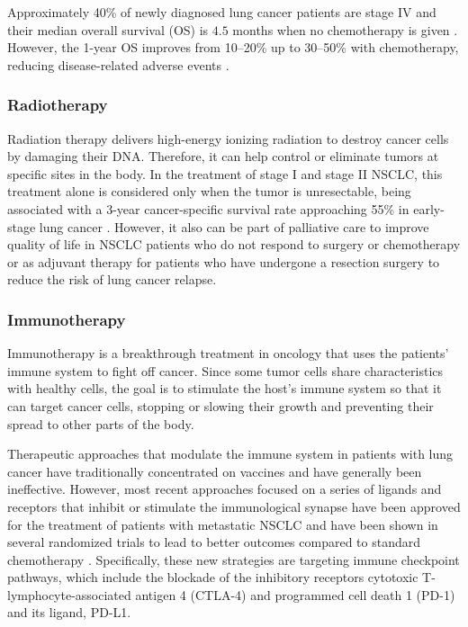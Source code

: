 Approximately 40\% of newly diagnosed lung cancer patients are stage IV and their median overall survival (OS) is $4.5$ months when no chemotherapy is given \cite{TNM}. However, the 1-year OS improves from 10–20\% up to 30–50\%  with chemotherapy, reducing disease-related adverse events \cite{EGFR_mutations}.

\subsubsection{Radiotherapy}

Radiation therapy delivers high-energy ionizing radiation to destroy cancer cells by damaging their DNA. Therefore, it can help control or eliminate tumors at specific sites in the body. In the treatment of stage I and stage II NSCLC, this treatment alone is considered only when the tumor is unresectable, being associated with a 3-year cancer-specific survival rate approaching 55\% in early-stage lung cancer \cite{Radio}. However, it also can be part of palliative care to improve quality of life in NSCLC patients who do not respond to surgery or chemotherapy or as adjuvant therapy for patients who have undergone a resection surgery to reduce the risk of lung cancer relapse.

\subsubsection{Immunotherapy}

Immunotherapy is a breakthrough treatment in oncology that uses the patients' immune system to fight off cancer. Since some tumor cells share characteristics with healthy cells, the goal is to stimulate the host's immune system so that it can target cancer cells, stopping or slowing their growth and preventing their spread to other parts of the body. 

Therapeutic approaches that modulate the immune system in patients with lung cancer have traditionally concentrated on vaccines and have generally been ineffective. However, most recent approaches focused on a series of ligands and receptors that inhibit or stimulate the immunological synapse have been approved for the treatment of patients with metastatic NSCLC and have been shown in several randomized trials to lead to better outcomes compared to standard chemotherapy \cite{Immuno}. Specifically, these new strategies are targeting immune checkpoint pathways, which include the blockade of the inhibitory receptors cytotoxic T-lymphocyte-associated antigen 4 (CTLA-4) and programmed cell death 1 (PD-1) and its ligand, PD-L1.


